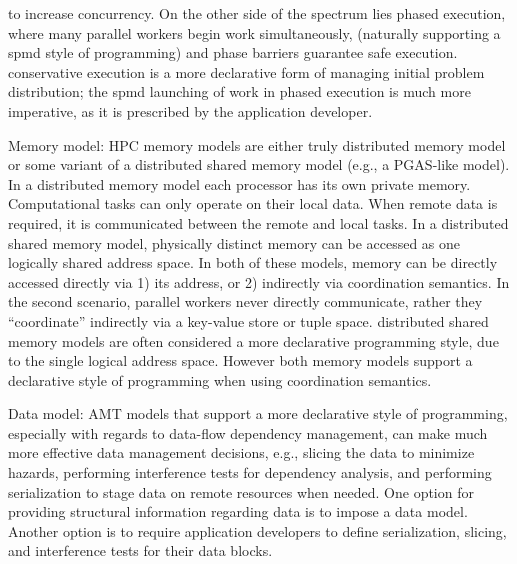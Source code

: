 \begin{compactdesc}
    to increase \gls{concurrency}.  On the other side of the spectrum lies
    \gls{phased execution}, where many parallel workers begin work simultaneously, (naturally supporting a \gls{spmd}
    style of programming) and \glspl{phase barrier} guarantee safe execution. 
    \Gls{conservative execution} is a more \gls{declarative} form of managing
    initial problem distribution; the \gls{spmd} launching of work in \gls{phased execution} 
    is much more \gls{imperative}, as it is prescribed by the application
    developer.
\item[Memory model:]
  \gls{HPC} \glspl{memory model} are either truly \gls{distributed memory
  model} or some variant of a \gls{distributed shared memory model} (e.g., a \gls{PGAS}-like model).  In a
     \gls{distributed memory model} each processor has its own private memory. 
     Computational tasks can only operate on their local data. When remote data
     is required, it is communicated between the remote and local tasks.
     In a \gls{distributed shared memory model}, physically distinct memory can be accessed as one
    logically shared address space.  In both of these models, memory can be
    directly accessed directly via 1) its address, or 2) indirectly via
    \gls{coordination semantics}. In the second scenario, parallel workers never directly
    communicate, rather they ``coordinate'' indirectly via a \gls{key-value
    store} or \gls{tuple space}.  \Glspl{distributed shared memory model} are
    often considered a more \gls{declarative} programming style, due to the
    single logical address space.  However both \glspl{memory model} support
    a \gls{declarative} style of programming when using \gls{coordination
    semantics}.
\item[Data model:]
 \Gls{AMT} models that support a more \gls{declarative} style of programming,
  especially with regards to \gls{data-flow dependency} management, 
  can make much more effective data management decisions, e.g., \gls{slicing} the data to minimize hazards, performing \glspl{interference test} for dependency
  analysis, and performing \gls{serialization} to stage data on remote resources when needed.  
  One option for providing structural information regarding data is to impose a
  \gls{data model}.  Another option is to require application developers to define
  \gls{serialization}, \gls{slicing}, and \glspl{interference test} for their data blocks. 
\end{compactdesc}


